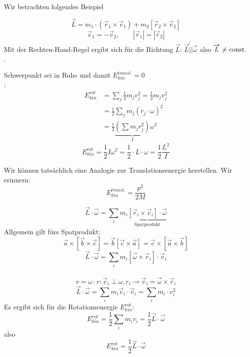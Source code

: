 \documentclass[a4paper,10pt]{scrartcl}
\begin{document}
\begin{sg}
Wir betrachten folgendes Beispiel
 \begin{ex}
\[
 \vec L = m_1 \cdot ( \vec r_1 \times \vec v_1) + m_2 [ \vec r_2 \times \vec v_2]
\]
\[
 \vec v_1 = - \vec v_2, \qquad |\vec r_1| = |\vec r_2|
\]
Mit der Rechten-Hand-Regel ergibt sich für die Richtung $\vec L$:  $\vec L \not{||} \vec \omega$ %
also $\overrightarrow{L}\neq \text{const}.$.
 \end{ex}
\end{sg}
\begin{sg}
 Schwerpunkt sei in Ruhe und damit $E_{kin}^{transl.}=0$\\
:
\begin{align*}
 E_{kin}^{rot}&= \sum_j \frac{1}{2} m_j v_j^2 =\frac{1}{2} m_j v_j^2\\
&= \frac{1}{2} \sum_j m_j (r_j\cdot \omega)^2\\
&= \frac{1}{2} \underbrace{(\sum m_j r_j^2)}_{I} \omega^2 
\end{align*}
\[
 E_{kin}^{rot}= \frac{1}{2} I \omega^2 = \frac{1}{2} \cdot L \cdot \omega = \frac{1}{2} \frac{L^2}{I}
\]
\end{sg}
\begin{note*}
 Wir können tatsächlich eine Analogie zur Translationsenergie herstellen. Wir erinnern:
\[
 \boxed{E_{kin}^{transl.} = \frac{p^2}{2M}}
\]
\end{note*}
\begin{sg}
\[
 \vec L \cdot \vec \omega= \sum_i m_i \underbrace{[\vec r_i \times \vec v_i] \cdot \vec \omega}_{\text{Spatprodukt}}
\]
Allgemein gilt fürs Spatprodukt:
\[
 \vec a \times [ \vec b \times \vec c]= \vec b [\vec c \times \vec a]= \vec c \times [ \vec a \times \vec b]
\]
\[
 \vec L \cdot \vec \omega = \sum_i m_i [\vec \omega \times \vec r_i] \cdot \vec v_i
\]
\\
$$v=\omega \cdot r: \vec v_i \perp \omega, r_i \to \vec v_i=\vec \omega \times \vec r_i$$
\[
 \vec L\cdot \vec \omega = \sum_i m_i \vec v_i \cdot \vec v_i= \sum_i m_i \cdot v_i^2 
\]
Es ergibt sich für die Rotationsenergie $E_{kin}^{rot}$:
\[
 E_{kin}^{rot}=\frac{1}{2} \sum_i m_i v_i=\frac{1}{2} \vec L \cdot \vec \omega
\]
also
\[
 \boxed{E_{kin}^{rot}=\frac{1}{2} \vec L \cdot \vec \omega}
\]
\end{sg}
\end{document}
